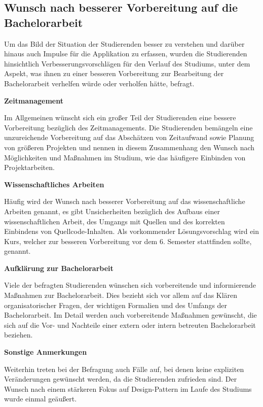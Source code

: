 \documentclass[bibliography=totoc,listof=totoc,BCOR=5mm,DIV=12,oneside]{scrbook}
\begin{document}
\newpage
\subsection{Wunsch nach besserer Vorbereitung auf die Bachelorarbeit}
\par Um das Bild der Situation der Studierenden besser zu verstehen und darüber hinaus auch Impulse für die Applikation zu erfassen, wurden die Studierenden hinsichtlich Verbesserungsvorschlägen für den Verlauf des Studiums, unter dem Aspekt, was ihnen zu einer besseren Vorbereitung zur Bearbeitung der Bachelorarbeit verhelfen würde oder verholfen hätte, befragt.

\par \bigskip \textbf{Zeitmanagement}
\par Im Allgemeinen wünscht sich ein großer Teil der Studierenden eine bessere Vorbereitung bezüglich des Zeitmanagements. Die Studierenden bemängeln eine unzureichende Vorbereitung auf das Abschätzen von Zeitaufwand sowie Planung von größeren Projekten und nennen in diesem Zusammenhang den Wunsch nach Möglichkeiten und Maßnahmen im Studium, wie das häufigere Einbinden von Projektarbeiten.

\par \bigskip \textbf{Wissenschaftliches Arbeiten}
\par Häufig wird der Wunsch nach besserer Vorbereitung auf das wissenschaftliche Arbeiten genannt, es gibt Unsicherheiten bezüglich des Aufbaus einer wissenschaftlichen Arbeit, des Umgangs mit Quellen und des korrekten Einbindens von Quellcode-Inhalten. Als vorkommender Lösungsvorschlag wird ein Kurs, welcher zur besseren Vorbereitung vor dem 6. Semester stattfinden sollte, genannt.

\par \bigskip \textbf{Aufklärung zur Bachelorarbeit}
\par Viele der befragten Studierenden wünschen sich vorbereitende und informierende Maßnahmen zur Bachelorarbeit. Dies bezieht sich vor allem auf das Klären organisatorischer Fragen, der wichtigen Formalien und des Umfangs der Bachelorarbeit. Im Detail werden auch vorbereitende Maßnahmen gewünscht, die sich auf die Vor- und Nachteile einer extern oder intern betreuten Bachelorarbeit beziehen.

\par \bigskip \textbf{Sonstige Anmerkungen}
\par Weiterhin treten bei der Befragung auch Fälle auf, bei denen keine expliziten Veränderungen gewünscht werden, da die Studierenden zufrieden sind. Der Wunsch nach einem stärkeren Fokus auf Design-Pattern im Laufe des Studiums wurde einmal geäußert.
\end{document}
